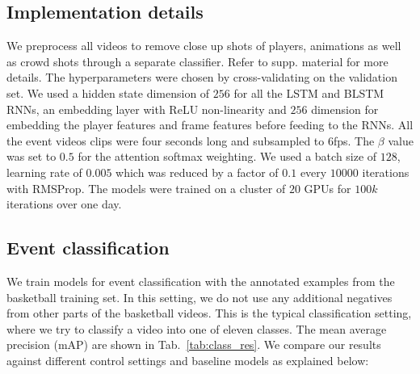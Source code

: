 \documentclass[10pt,twocolumn,letterpaper]{article}
\begin{document}
\subsection{Implementation details}
We preprocess all videos to remove close up shots of players, animations as
well as crowd shots through a separate classifier. Refer to supp. material for
more details.  The hyperparameters were chosen by cross-validating on the
validation set.  We used a hidden state dimension of $256$ for all the LSTM and
BLSTM RNNs, an embedding layer with ReLU non-linearity and $256$ dimension for
embedding the player features and frame features before feeding to the RNNs.
All the event videos clips were four seconds long and subsampled to 6fps.  The
$\beta$ value was set to $0.5$ for the attention softmax weighting. We used a
batch size of $128$, learning rate of $0.005$ which was reduced by a factor of
$0.1$ every $10000$ iterations with RMSProp\cite{RMSProp}. The models were trained on
a cluster of $20$ GPUs for $100k$ iterations over one day.

\subsection{Event classification}
We train models for event classification with the annotated examples
from the basketball training set. In this setting, we do not use any
additional negatives from other parts of the basketball videos. This
is the typical classification setting, where we try to classify a
video into one of eleven classes. The mean average precision (mAP)
are shown in Tab.~\ref{tab:class_res}. We compare our results
against different control settings and baseline models as explained
below:
\end{document}
